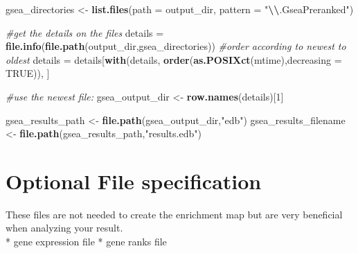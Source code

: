 \documentclass[
]{book}
\newenvironment{Shaded}{\begin{snugshade}}{\end{snugshade}}
\newcommand{\AttributeTok}[1]{\textcolor[rgb]{0.13,0.29,0.53}{#1}}
\newcommand{\CommentTok}[1]{\textcolor[rgb]{0.56,0.35,0.01}{\textit{#1}}}
\newcommand{\ConstantTok}[1]{\textcolor[rgb]{0.56,0.35,0.01}{#1}}
\newcommand{\DecValTok}[1]{\textcolor[rgb]{0.00,0.00,0.81}{#1}}
\newcommand{\FunctionTok}[1]{\textcolor[rgb]{0.13,0.29,0.53}{\textbf{#1}}}
\newcommand{\NormalTok}[1]{#1}
\newcommand{\OtherTok}[1]{\textcolor[rgb]{0.56,0.35,0.01}{#1}}
\newcommand{\SpecialCharTok}[1]{\textcolor[rgb]{0.81,0.36,0.00}{\textbf{#1}}}
\newcommand{\StringTok}[1]{\textcolor[rgb]{0.31,0.60,0.02}{#1}}
\begin{document}
\begin{Shaded}
\begin{Highlighting}[]
\NormalTok{gsea\_directories }\OtherTok{\textless{}{-}} \FunctionTok{list.files}\NormalTok{(}\AttributeTok{path =}\NormalTok{ output\_dir, }\AttributeTok{pattern =} \StringTok{"}\SpecialCharTok{\textbackslash{}\textbackslash{}}\StringTok{.GseaPreranked"}\NormalTok{)}

\CommentTok{\#get the details on the files}
\NormalTok{details }\OtherTok{=} \FunctionTok{file.info}\NormalTok{(}\FunctionTok{file.path}\NormalTok{(output\_dir,gsea\_directories))}
\CommentTok{\#order according to newest to oldest}
\NormalTok{details }\OtherTok{=}\NormalTok{ details[}\FunctionTok{with}\NormalTok{(details, }\FunctionTok{order}\NormalTok{(}\FunctionTok{as.POSIXct}\NormalTok{(mtime),}\AttributeTok{decreasing =} \ConstantTok{TRUE}\NormalTok{)), ]}

\CommentTok{\#use the newest file:}
\NormalTok{gsea\_output\_dir }\OtherTok{\textless{}{-}} \FunctionTok{row.names}\NormalTok{(details)[}\DecValTok{1}\NormalTok{]}

\NormalTok{gsea\_results\_path }\OtherTok{\textless{}{-}} \FunctionTok{file.path}\NormalTok{(gsea\_output\_dir,}\StringTok{"edb"}\NormalTok{)}
\NormalTok{gsea\_results\_filename }\OtherTok{\textless{}{-}} \FunctionTok{file.path}\NormalTok{(gsea\_results\_path,}\StringTok{"results.edb"}\NormalTok{)}
\end{Highlighting}
\end{Shaded}

\section{Optional File specification}\label{optional-file-specification}

These files are not needed to create the enrichment map but are very beneficial when analyzing your result.\\
* gene expression file
* gene ranks file

\begin{Shaded}
\end{Shaded}
\end{document}
